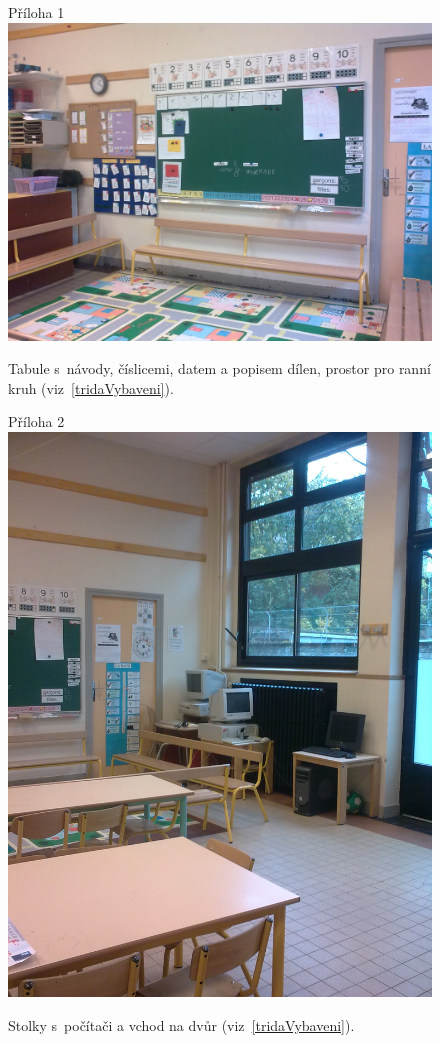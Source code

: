 	\begin{figure}[tb]
		\centering
		Příloha 1\\
		\includegraphics[height = 0.35\textheight]{./fotky/Obr1.jpg}
		\caption{
			Tabule s~návody, číslicemi, datem a popisem dílen, prostor pro ranní kruh (viz~\ref{tridaVybaveni}).
		}
		\label{Obr1}
	\end{figure}

	\begin{figure}[tb]
		\centering
		Příloha 2\\
		\includegraphics[height = 0.35\textheight]{./fotky/Obr2.jpg}
		\caption{
			Stolky s~počítači a vchod na dvůr (viz~\ref{tridaVybaveni}).
		}
		\label{Obr2}
	\end{figure}

